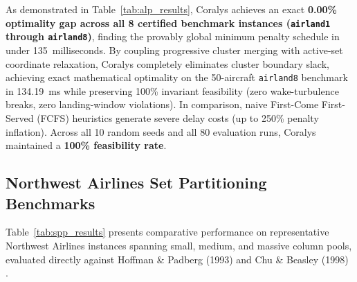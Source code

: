 \documentclass[10pt,journal,compsoc]{IEEEtran}
\begin{document}
As demonstrated in Table~\ref{tab:alp_results}, Coralys achieves an exact \textbf{0.00\% optimality gap across all 8 certified benchmark instances (\texttt{airland1} through \texttt{airland8})}, finding the provably global minimum penalty schedule in under 135~milliseconds. By coupling progressive cluster merging with active-set coordinate relaxation, Coralys completely eliminates cluster boundary slack, achieving exact mathematical optimality on the 50-aircraft \texttt{airland8} benchmark in 134.19~ms while preserving 100\% invariant feasibility (zero wake-turbulence breaks, zero landing-window violations). In comparison, naive First-Come First-Served (FCFS) heuristics generate severe delay costs (up to 250\% penalty inflation). Across all 10 random seeds and all 80 evaluation runs, Coralys maintained a \textbf{100\% feasibility rate}.

\subsection{Northwest Airlines Set Partitioning Benchmarks}
Table~\ref{tab:spp_results} presents comparative performance on representative Northwest Airlines instances spanning small, medium, and massive column pools, evaluated directly against Hoffman \& Padberg (1993) \cite{hoffman1993solving} and Chu \& Beasley (1998) \cite{chu1998constraint}.
\end{document}
